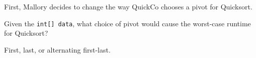 \begin{blocksection}
\question First, Mallory decides to change the way QuickCo chooses a pivot for
Quicksort.

Given the \lstinline$int[] data$, what choice of pivot would cause the
worst-case runtime for Quicksort?

\begin{solution}[0.5in]
First, last, or alternating first-last.
\end{solution}
\end{blocksection}
